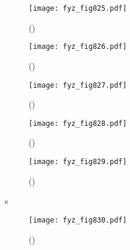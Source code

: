 {    \begin{figure}[ht!] %
      \centering
      \texttt{[image: fyz\_fig825.pdf]}
      \caption{
               (\cite[s.~707]{Feynman02})}
      \label{fyz_fig825}
    \end{figure}

    \begin{figure}[ht!] %
      \centering
      \texttt{[image: fyz\_fig826.pdf]}
      \caption{
               (\cite[s.~707]{Feynman02})}
      \label{fyz_fig826}
    \end{figure}

    \begin{figure}[ht!] %
      \centering
      \texttt{[image: fyz\_fig827.pdf]}
      \caption{
               (\cite[s.~707]{Feynman02})}
      \label{fyz_fig827}
    \end{figure}

    \begin{figure}[ht!] %
      \centering
      \texttt{[image: fyz\_fig828.pdf]}
      \caption{
               (\cite[s.~707]{Feynman02})}
      \label{fyz_fig828}
    \end{figure}

    \begin{figure}[ht!] %
      \centering
      \texttt{[image: fyz\_fig829.pdf]}
      \caption{
               (\cite[s.~707]{Feynman02})}
      \label{fyz_fig829}
    \end{figure}
s
    \begin{figure}[ht!] %
      \centering
      \texttt{[image: fyz\_fig830.pdf]}
      \caption{
               (\cite[s.~707]{Feynman02})}
      \label{fyz_fig830}
    \end{figure}

} %
\printbibliography[title={Seznam literatury},heading=subbibliography]
